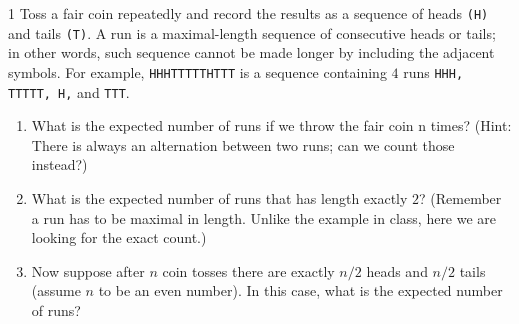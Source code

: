 \documentclass[12pt]{article}
\begin{document}


\begin{problem}{1}
    Toss a fair coin repeatedly and record the results as a sequence of heads \texttt{(H)} and tails \texttt{(T)}. A run
    is a maximal-length sequence of consecutive heads or tails; in other words, such sequence cannot
    be made longer by including the adjacent symbols. For example, \texttt{HHHTTTTTHTTT} is a sequence
    containing $4$ runs \texttt{HHH, TTTTT, H,} and \texttt{TTT}.
    \begin{enumerate}
        \item What is the expected number of runs if we throw the fair coin n times? (Hint: There is always an alternation between two runs; can we count those instead?)
        \item What is the expected number of runs that has length exactly $2$? (Remember a run has to be maximal in length. Unlike the example in class, here we are looking for the exact count.)
        \item  Now suppose after $n$ coin tosses there are exactly $n/2$ heads and $n/2$ tails (assume $n$ to be an even number). In this case, what is the expected number of runs?
    \end{enumerate}
\end{problem}
\end{document}
